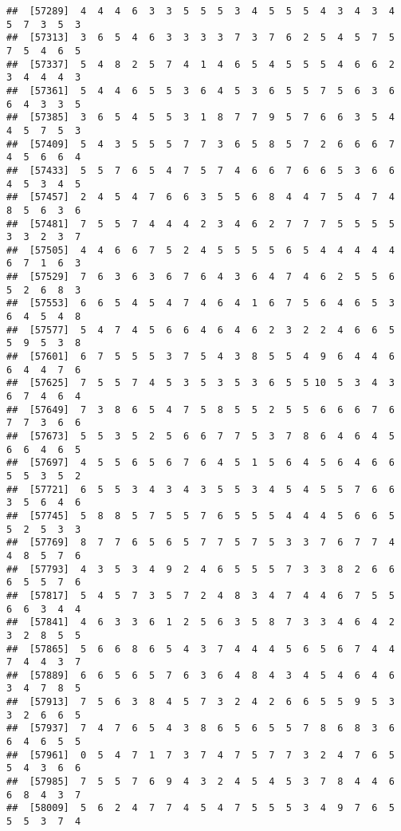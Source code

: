 \documentclass[
]{book}
\begin{document}
\begin{verbatim}
##  [57289]  4  4  4  6  3  3  5  5  5  3  4  5  5  5  4  3  4  3  4  5  7  3  5  3
##  [57313]  3  6  5  4  6  3  3  3  3  7  3  7  6  2  5  4  5  7  5  7  5  4  6  5
##  [57337]  5  4  8  2  5  7  4  1  4  6  5  4  5  5  5  4  6  6  2  3  4  4  4  3
##  [57361]  5  4  4  6  5  5  3  6  4  5  3  6  5  5  7  5  6  3  6  6  4  3  3  5
##  [57385]  3  6  5  4  5  5  3  1  8  7  7  9  5  7  6  6  3  5  4  4  5  7  5  3
##  [57409]  5  4  3  5  5  5  7  7  3  6  5  8  5  7  2  6  6  6  7  4  5  6  6  4
##  [57433]  5  5  7  6  5  4  7  5  7  4  6  6  7  6  6  5  3  6  6  4  5  3  4  5
##  [57457]  2  4  5  4  7  6  6  3  5  5  6  8  4  4  7  5  4  7  4  8  5  6  3  6
##  [57481]  7  5  5  7  4  4  4  2  3  4  6  2  7  7  7  5  5  5  5  3  3  2  3  7
##  [57505]  4  4  6  6  7  5  2  4  5  5  5  5  6  5  4  4  4  4  4  6  7  1  6  3
##  [57529]  7  6  3  6  3  6  7  6  4  3  6  4  7  4  6  2  5  5  6  5  2  6  8  3
##  [57553]  6  6  5  4  5  4  7  4  6  4  1  6  7  5  6  4  6  5  3  6  4  5  4  8
##  [57577]  5  4  7  4  5  6  6  4  6  4  6  2  3  2  2  4  6  6  5  5  9  5  3  8
##  [57601]  6  7  5  5  5  3  7  5  4  3  8  5  5  4  9  6  4  4  6  6  4  4  7  6
##  [57625]  7  5  5  7  4  5  3  5  3  5  3  6  5  5 10  5  3  4  3  6  7  4  6  4
##  [57649]  7  3  8  6  5  4  7  5  8  5  5  2  5  5  6  6  6  7  6  7  7  3  6  6
##  [57673]  5  5  3  5  2  5  6  6  7  7  5  3  7  8  6  4  6  4  5  6  6  4  6  5
##  [57697]  4  5  5  6  5  6  7  6  4  5  1  5  6  4  5  6  4  6  6  5  5  3  5  2
##  [57721]  6  5  5  3  4  3  4  3  5  5  3  4  5  4  5  5  7  6  6  3  5  6  4  6
##  [57745]  5  8  8  5  7  5  5  7  6  5  5  5  4  4  4  5  6  6  5  5  2  5  3  3
##  [57769]  8  7  7  6  5  6  5  7  7  5  7  5  3  3  7  6  7  7  4  4  8  5  7  6
##  [57793]  4  3  5  3  4  9  2  4  6  5  5  5  7  3  3  8  2  6  6  6  5  5  7  6
##  [57817]  5  4  5  7  3  5  7  2  4  8  3  4  7  4  4  6  7  5  5  6  6  3  4  4
##  [57841]  4  6  3  3  6  1  2  5  6  3  5  8  7  3  3  4  6  4  2  3  2  8  5  5
##  [57865]  5  6  6  8  6  5  4  3  7  4  4  4  5  6  5  6  7  4  4  7  4  4  3  7
##  [57889]  6  6  5  6  5  7  6  3  6  4  8  4  3  4  5  4  6  4  6  3  4  7  8  5
##  [57913]  7  5  6  3  8  4  5  7  3  2  4  2  6  6  5  5  9  5  3  3  2  6  6  5
##  [57937]  7  4  7  6  5  4  3  8  6  5  6  5  5  7  8  6  8  3  6  6  4  6  5  5
##  [57961]  0  5  4  7  1  7  3  7  4  7  5  7  7  3  2  4  7  6  5  5  4  3  6  6
##  [57985]  7  5  5  7  6  9  4  3  2  4  5  4  5  3  7  8  4  4  6  6  8  4  3  7
##  [58009]  5  6  2  4  7  7  4  5  4  7  5  5  5  3  4  9  7  6  5  5  5  3  7  4

\end{verbatim}
\end{document}

